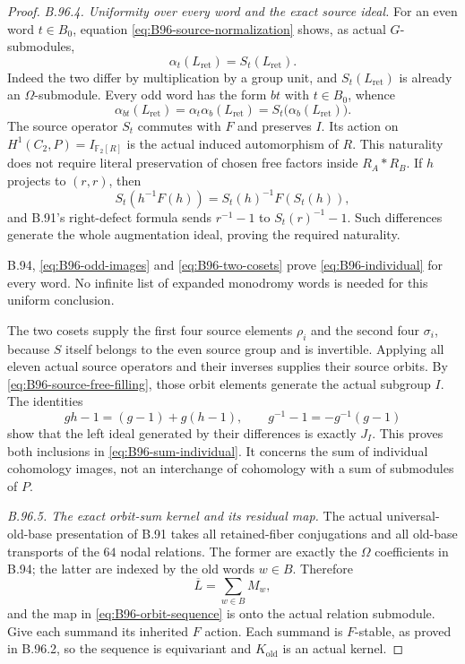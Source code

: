 \begin{proof}
\emph{B.96.4. Uniformity over every word and the exact source ideal.}
For an even word $t\in B_0$, equation
\eqref{eq:B96-source-normalization} shows, as actual $G$-submodules,
\[
                   \alpha_t(L_{\mathrm{ret}})=S_t(L_{\mathrm{ret}}).
\]
Indeed the two differ by multiplication by a group unit, and
$S_t(L_{\mathrm{ret}})$ is already an $\Omega$-submodule.
Every odd word has the form $bt$ with $t\in B_0$, whence
\begin{equation}\label{eq:B96-two-cosets}
 \alpha_{bt}(L_{\mathrm{ret}})
        =\alpha_t\alpha_b(L_{\mathrm{ret}})
        =S_t\bigl(\alpha_b(L_{\mathrm{ret}})\bigr).
\end{equation}
The source operator $S_t$ commutes with $F$ and preserves $I$.
Its action on $H^1(C_2,P)=I_{\mathbb F_2[R]}$ is the actual
induced automorphism of $R$.  This naturality does not require
literal preservation of chosen free factors inside $R_A*R_B$.
If $h$ projects to $(r,r)$, then
\[
 S_t(h^{-1}F(h))=S_t(h)^{-1}F(S_t(h)),
\]
and B.91's right-defect formula sends $r^{-1}-1$ to
$S_t(r)^{-1}-1$.  Such differences generate the whole
augmentation ideal, proving the required naturality.

B.94, \eqref{eq:B96-odd-images} and
\eqref{eq:B96-two-cosets} prove \eqref{eq:B96-individual}
for every word.  No infinite list of expanded monodromy words
is needed for this uniform conclusion.

The two cosets supply the first four source elements $\rho_i$
and the second four $\sigma_i$, because $S$ itself belongs to
the even source group and is invertible.  Applying all eleven
actual source operators and their inverses supplies their
source orbits.  By \eqref{eq:B96-source-free-filling}, those
orbit elements generate the actual subgroup $I$.  The identities
\[
 gh-1=(g-1)+g(h-1),\qquad g^{-1}-1=-g^{-1}(g-1)
\]
show that the left ideal generated by their differences is
exactly $J_I$.  This proves both inclusions in
\eqref{eq:B96-sum-individual}.  It concerns the sum of individual
cohomology images, not an interchange of cohomology with a sum
of submodules of $P$.

\emph{B.96.5. The exact orbit-sum kernel and its residual map.}
The actual universal-old-base presentation of B.91 takes all
retained-fiber conjugations and all old-base transports of the
$64$ nodal relations.  The former are exactly the $\Omega$
coefficients in B.94; the latter are indexed by the old words
$w\in B$.  Therefore
\[
                         \overline L=\sum_{w\in B}M_w,
\]
and the map in \eqref{eq:B96-orbit-sequence} is onto the actual
relation submodule.  Give each summand its inherited $F$ action.
Each summand is $F$-stable, as proved in B.96.2, so the sequence
is equivariant and $K_{\mathrm{old}}$ is an actual kernel.


\end{proof}
